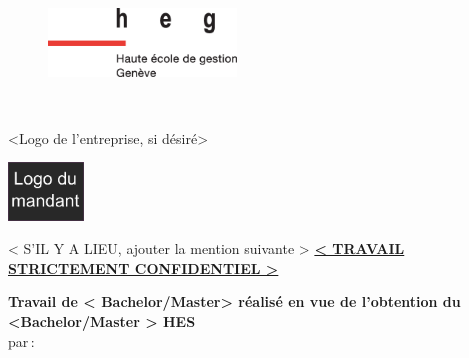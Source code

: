 
\makeatletter	%
	\begin{titlepage}

		\begin{figure}[H]
			\includegraphics[width=5cm]{images/heg-logo.eps}
		\end{figure}
	
		\begin{center}
			
			{\LARGE \textbf{\Huge \@title}} \\

			\vspace{1cm}
			
			<Logo de l'entreprise, si désiré>\\	%
			
			\vspace{.2cm}
			
			\includegraphics[width=2cm]{images/logo-mandant.png}
			
			\vspace{1cm}
			\vfill
		
			{\large < S'IL Y A LIEU, ajouter la mention suivante >}
				\textbf{\Large{ \textsc{ \underline{< TRAVAIL STRICTEMENT CONFIDENTIEL >}}}}\\

			\vspace{2cm}

			\textbf{\Large Travail de < Bachelor/Master> réalisé en vue de l’obtention du <Bachelor/Master > HES}\\
				par\textbf{\,}:\\
				\textbf{\Large \@author} \\


\end{center}
\end{titlepage}
